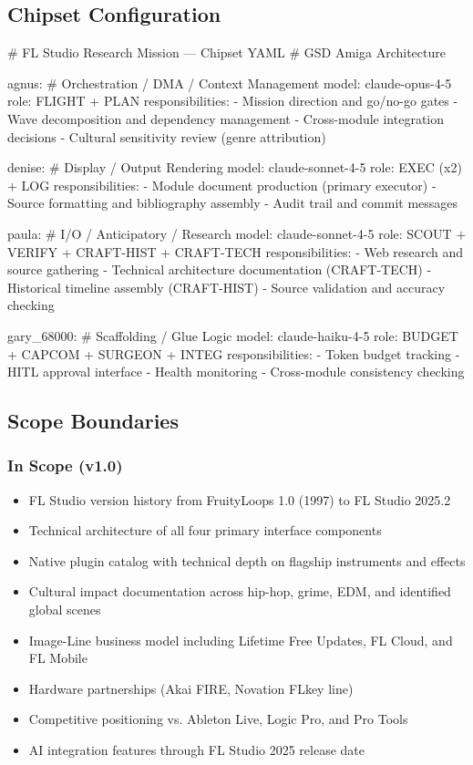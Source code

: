 \documentclass[11pt,letterpaper]{article}
\begin{document}
\subsection{Chipset Configuration}

\begin{asciibox}
# FL Studio Research Mission --- Chipset YAML
# GSD Amiga Architecture

agnus:                    # Orchestration / DMA / Context Management
  model: claude-opus-4-5
  role: FLIGHT + PLAN
  responsibilities:
    - Mission direction and go/no-go gates
    - Wave decomposition and dependency management
    - Cross-module integration decisions
    - Cultural sensitivity review (genre attribution)

denise:                   # Display / Output Rendering
  model: claude-sonnet-4-5
  role: EXEC (x2) + LOG
  responsibilities:
    - Module document production (primary executor)
    - Source formatting and bibliography assembly
    - Audit trail and commit messages

paula:                    # I/O / Anticipatory / Research
  model: claude-sonnet-4-5
  role: SCOUT + VERIFY + CRAFT-HIST + CRAFT-TECH
  responsibilities:
    - Web research and source gathering
    - Technical architecture documentation (CRAFT-TECH)
    - Historical timeline assembly (CRAFT-HIST)
    - Source validation and accuracy checking

gary_68000:               # Scaffolding / Glue Logic
  model: claude-haiku-4-5
  role: BUDGET + CAPCOM + SURGEON + INTEG
  responsibilities:
    - Token budget tracking
    - HITL approval interface
    - Health monitoring
    - Cross-module consistency checking
\end{asciibox}

\subsection{Scope Boundaries}

\subsubsection{In Scope (v1.0)}
\begin{itemize}[noitemsep]
  \item FL Studio version history from FruityLoops 1.0 (1997) to FL Studio 2025.2
  \item Technical architecture of all four primary interface components
  \item Native plugin catalog with technical depth on flagship instruments and effects
  \item Cultural impact documentation across hip-hop, grime, EDM, and identified global scenes
  \item Image-Line business model including Lifetime Free Updates, FL Cloud, and FL Mobile
  \item Hardware partnerships (Akai FIRE, Novation FLkey line)
  \item Competitive positioning vs. Ableton Live, Logic Pro, and Pro Tools
  \item AI integration features through FL Studio 2025 release date
\end{itemize}
\end{document}
